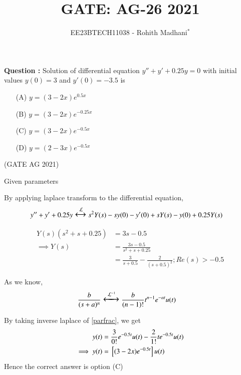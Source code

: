 \documentclass[journal,12pt,twocolumn]{IEEEtran}
\theoremstyle{remark}
\begin{document}

\vspace{3cm}

\title{GATE: AG-26 2021}
\author{EE23BTECH11038 - Rohith Madhani$^{*}$%
}
\maketitle
\newpage
\bigskip
\renewcommand{\thefigure}{\theenumi}
\renewcommand{\thetable}{\theenumi}

\textbf{Question :} Solution of differential equation $y'' + y'+ 0.25y = 0$ with initial values $y(0) = 3$ and $y'(0) = -3.5$ is
\begin{enumerate}
    \item[(A)] $ y = (3-2x)e^{0.5x} $
    \item[(B)] $ y = (3-2x)e^{-0.25x}$
    \item[(C)] $ y = (3-2x)e^{-0.5x}$
    \item[(D)] $ y = (2-3x)e^{-0.5x}$
\end{enumerate} 
\hfill(GATE AG 2021) \\
\solution
\fi

\begin{table}[!h] 
    \centering
    
    \caption{Given parameters}
    \label{table:gate21ag26}
\end{table}
By applying laplace transform to the differential equation,
\begin{align}
    y''+y'+0.25y &\Large\xleftrightarrow{\mathcal{L}} s^2Y(s)-sy(0)-y'(0)+sY(s)-y(0)+0.25Y(s)
\end{align}

\begin{align}
    Y(s)(s^2 + s + 0.25) &= 3s - 0.5 \\
    \implies Y(s) &= \frac{3s-0.5}{s^2 + s + 0.25} \\
    &= \frac{3}{s+0.5} - \frac{2}{(s+0.5)^2};Re(s) > -0.5 \label{parfrac}
\end{align}

As we know,
\begin{align}
    \frac{b}{(s+a)^n} &\Large\xleftrightarrow{\mathcal{L}^{-1}}\frac{b}{(n-1)!} t^{n-1} e^{-at} u(t)
\end{align}

By taking inverse laplace of \eqref{parfrac}, we get
\begin{align}
    y(t) &= \frac{3}{0!}e^{-0.5t}u(t)-\frac{2}{1!}te^{-0.5t}u(t) \\
    \implies y(t) &= {}\left[(3-2x)e^{-0.5t}\right]u(t)
\end{align}
Hence the correct answer is option (C)
\newpage
\end{document}

